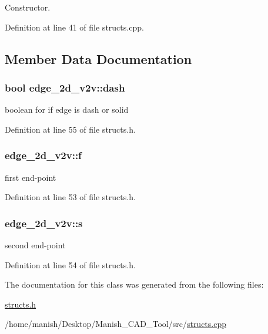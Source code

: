 Constructor. 



Definition at line 41 of file structs.\+cpp.



\subsection{Member Data Documentation}
\subsubsection[{\texorpdfstring{dash}{dash}}]{\setlength{\rightskip}{0pt plus 5cm}bool edge\+\_\+2d\+\_\+v2v\+::dash}\hypertarget{classedge__2d__v2v_a0d7a74be9d49be2c429b7274a3011119}{}\label{classedge__2d__v2v_a0d7a74be9d49be2c429b7274a3011119}


boolean for if edge is dash or solid 



Definition at line 55 of file structs.\+h.

\subsubsection[{\texorpdfstring{f}{f}}]{ edge\+\_\+2d\+\_\+v2v\+::f}\hypertarget{classedge__2d__v2v_a329f701b47c323a9d200b62b208bf4c9}{}\label{classedge__2d__v2v_a329f701b47c323a9d200b62b208bf4c9}


first end-\/point 



Definition at line 53 of file structs.\+h.

\subsubsection[{\texorpdfstring{s}{s}}]{ edge\+\_\+2d\+\_\+v2v\+::s}\hypertarget{classedge__2d__v2v_af2a0304bd993964329335adf6a574302}{}\label{classedge__2d__v2v_af2a0304bd993964329335adf6a574302}


second end-\/point 



Definition at line 54 of file structs.\+h.



The documentation for this class was generated from the following files\+:\begin{DoxyCompactItemize}
\item 
\hyperlink{structs_8h}{structs.\+h}\item 
/home/manish/\+Desktop/\+Manish\+\_\+\+C\+A\+D\+\_\+\+Tool/src/\hyperlink{structs_8cpp}{structs.\+cpp}\end{DoxyCompactItemize}
